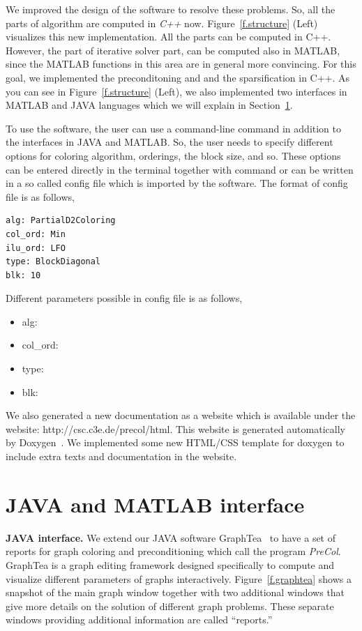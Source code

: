 \documentclass[12pt, oneside]{book}
\begin{document}
We improved the design of the software to resolve these problems.
So, all the parts of algorithm are computed in \textit{C++} now.
Figure~\ref{f.structure} (Left) visualizes this new implementation.
All the parts can be computed in C++. However, 
the part of iterative solver part, can be computed also in MATLAB,
since the MATLAB functions in this area are in general more convincing. 
For this goal, we implemented the preconditoning and 
and the sparsification in C++. 
As you can see in Figure~\ref{f.structure} (Left), we also implemented
two interfaces in MATLAB and JAVA languages which we will explain in 
Section~\ref{s.interfaces}.

To use the software, the user can use a command-line command in addition to
the interfaces in JAVA and MATLAB. So, the user needs to specify different
options for coloring algorithm, orderings, the block size, and so.
These options can be entered directly in the terminal together with command
or can be written in a so called config file which is imported by the software. 
The format of config file is as follows,
\begin{lstlisting}
alg: PartialD2Coloring
col_ord: Min
ilu_ord: LFO
type: BlockDiagonal
blk: 10
\end{lstlisting}
Different parameters possible in config file is as follows,
\begin{itemize}
\item alg:
\item col\_ord: 
\item type:
\item blk:
\end{itemize}

We also generated a new documentation as a website which is available
under the website: http://csc.c3e.de/precol/html.
This website is generated automatically by Doxygen~\cite{Lischner2013}.
We implemented some new HTML/CSS template for doxygen to include extra
texts and documentation in the website.

\section{JAVA and MATLAB interface}
\label{s.interfaces}
\textbf{JAVA interface.}
We extend our JAVA software GraphTea~
\cite{2014:07,2014:15,2014:16,2015:05,2015:06,2015:07,2015:08} to have a
set of reports for graph coloring and preconditioning which call the program
\textit{PreCol}.
GraphTea is a graph editing framework designed specifically to compute and visualize
different parameters of graphs interactively.
Figure~\ref{f.graphtea} shows a snapshot of the main
graph window together with two additional windows that give more details on the solution
of different graph problems. These separate windows providing additional information are
called ``reports.''
\end{document}

